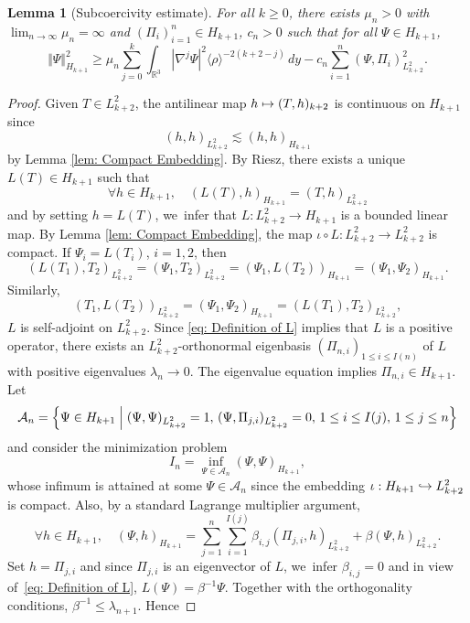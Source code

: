 \documentclass[JEP,XML,SOM,Unicode]{cedram}
\newcommand\mto{\mathchoice{\longmapsto}{\mapsto}{\mapsto}{\mapsto}}
\newcommand\hto{\mathrel{\lhook\joinrel\to}}
\theoremstyle{plain}
\newtheorem{lemma}[proposition]{Lemma}
\theoremstyle{definition}
\begin{document}
\begin{lemma}[Subcoercivity estimate]
\label{lem: Subcoercivity Estimate}
For all $k\ge0$, there exists $\mu_n>0$ with $\lim_{n\to\infty }\mu_n=\infty$ and $(\Pi_i)_{i=1}^{n}\in H_{k+1}$, $c_n>0$ such that for all $\Psi\in H_{k+1}$,
\begin{equation}
\label{eq: Coercivity}
\Vert \Psi\Vert_{H_{k+1}}^2 \ge \mu_n\sum_{j=0}^{k} \int_{\mathbb R^3}|\nabla^j \Psi|^2\langle \rho\rangle ^{-2(k+2-j)}\,dy-c_n\sum_{i=1}^{n}(\Psi,\Pi_i)_{L_{k+2}^2}^2.
\end{equation}
\end{lemma}
\begin{proof}
Given $T\in L_{k+2}^2$, the antilinear map $h\mto (T,h)_{k+2}$ is continuous on $H_{k+1}$ since
\[
(h,h)_{L_{k+2}^2}\lesssim ( h,h)_{H_{k+1}}
\]
by Lemma \ref{lem: Compact Embedding}. By Riesz, there exists a unique $L(T)\in H_{k+1}$ such that
\begin{equation}
\label{eq: Definition of L}
\forall h\in H_{k+1},\quad ( L(T),h)_{H_{k+1}}=(T,h)_{L_{k+2}^2}
\end{equation}
and by setting $h=L(T)$, we~infer that $L: L_{k+2}^2\to H_{k+1}$ is a bounded linear map. By Lemma \ref{lem: Compact Embedding}, the map $\iota\circ L:L_{k+2}^2\to L_{k+2}^2$ is compact. If $\Psi_i=L(T_i)$, $i=1,2$, then
\[
(L(T_1),T_2)_{L_{k+2}^2}=(\Psi_1,T_2)_{L_{k+2}^2}=(\Psi_1,L(T_2))_{H_{k+1}}= ( \Psi_1,\Psi_2 )_{H_{k+1}}.
\]
Similarly,
\[
(T_1,L(T_2))_{L_{k+2}^2}=( \Psi_1,\Psi_2 )_{H_{k+1}}=(L(T_1),T_2)_{L_{k+2}^2},
\]
\ie $L$ is self-adjoint on $L_{k+2}^2$. Since \eqref{eq: Definition of L} implies that $L$ is a positive operator, there exists an $L_{k+2}^2$-orthonormal eigenbasis $(\Pi_{n,i})_{1\le i\le I(n)}$ of $L$ with positive eigenvalues $\lambda_n\to0$. The eigenvalue equation implies $\Pi_{n,i}\in H_{k+1}$. Let
\[
\mathcal A_n=\Big\{\Psi\in H_{k+1} \Bigm| (\Psi,\Psi)_{L_{k+2}^2}=1,\, (\Psi,\Pi_{j,i})_{L_{k+2}^2}=0,\,1\le i\le I(j),\, 1\le j\le n\Big\}
\]
and consider the minimization problem\vspace*{-3pt}
\[
I_n=\inf_{\Psi\in \mathcal A_n}(\Psi,\Psi)_{H_{k+1}},
\]
whose infimum is attained at some $\Psi\in \mathcal A_n$ since the embedding $\iota:H_{k+1}\hto  L_{k+2}^2$ is compact. Also, by a standard Lagrange multiplier argument,\vspace*{-3pt}
\[
\forall h\in H_{k+1},\quad( \Psi,h)_{H_{k+1}}=\sum_{j=1}^n\sum_{i=1}^{I(j)}\beta_{i,j}(\Pi_{j,i},h)_{L_{k+2}^2}+\beta(\Psi,h)_{L_{k+2}^2}.
\]
Set $h=\Pi_{j,i}$ and since $\Pi_{j,i}$ is an eigenvector of $L$, we~infer $\beta_{i,j}=0$ and in view of~\eqref{eq: Definition of L}, $L(\Psi)=\beta^{-1}\Psi$. Together with the orthogonality conditions, $\beta^{-1}\le \lambda_{n+1}$. Hence\vspace*{-3pt}

\end{proof}
\end{document}
